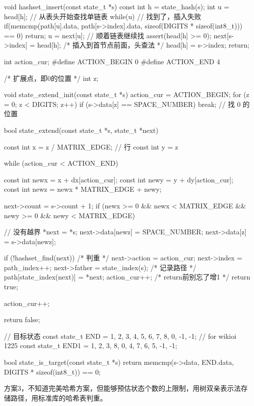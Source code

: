 \begin{Codex}[label=eight_digits_bfs2.c]
void hashset_insert(const state_t *s) {
    const int h = state_hash(s);
    int u = head[h]; // 从表头开始查找单链表
    while(u) {
        // 找到了，插入失败
        if(memcmp(path[u].data, path[s->index].data,
                sizeof(DIGITS * sizeof(int8_t))) == 0) return;
        u = next[u]; // 顺着链表继续找
    }
    assert(head[h] >= 0);
    next[s->index] = head[h];  /* 插入到首节点前面，头查法 */
    head[h] = s->index;
    return;
}

int action_cur;
#define ACTION_BEGIN 0
#define ACTION_END 4

/* 扩展点，即0的位置 */
int z;

void state_extend_init(const state_t *s) {
    action_cur = ACTION_BEGIN;
    for (z = 0; z < DIGITS; z++) {
        if (s->data[z] == SPACE_NUMBER) {
            break;  // 找 0 的位置
        }
    }
}

bool state_extend(const state_t *s, state_t *next) {
    const int x = z / MATRIX_EDGE; // 行
    const int y = z %

    while (action_cur < ACTION_END) {
        const int newx = x + dx[action_cur];
        const int newy = y + dy[action_cur];
        const int newz = newx * MATRIX_EDGE + newy;

        next->count = s->count + 1;
        if (newx >= 0 && newx < MATRIX_EDGE && newy >= 0 &&
                newy < MATRIX_EDGE) { // 没有越界
            *next = *s;
            next->data[newz] = SPACE_NUMBER;
            next->data[z] = s->data[newz];

            if (!hashset_find(next)) { /* 判重 */
                next->action = action_cur;
                next->index = path_index++;
                next->father = state_index(s);
                /* 记录路径 */
                path[state_index(next)] = *next;
                action_cur++; /* return前别忘了增1 */
                return true;
            }
        }
        action_cur++;
    }
    return false;
}

// 目标状态
const state_t END = {{1, 2, 3, 4, 5, 6, 7, 8, 0}, -1, -1};
// for wikioi 1225
const state_t END1 = {{1, 2, 3, 8, 0, 4, 7, 6, 5}, -1, -1};

bool state_is_target(const state_t *s) {
    return memcmp(s->data, END.data, DIGITS * sizeof(int8_t)) == 0;
}
\end{Codex}

方案3，不知道完美哈希方案，但能够预估状态个数的上限制，用树双亲表示法存储路径，用标准库的哈希表判重。

